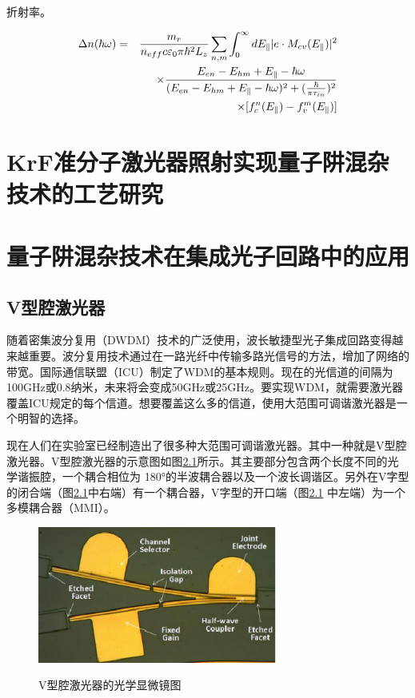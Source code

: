 \documentclass{ZJUthesis}
\begin{document}
折射率。

\begin{eqnarray}
    \Delta n(\hbar\omega) &=& \frac{m_r}{n_{eff} c \varepsilon_0 \pi \hbar^2 L_z}
        \sum_{n,m} \int_0^\infty dE_\parallel |e\cdot M_{cv}(E_\parallel)|^2 \notag\\
    && \times \frac{E_{en}-E_{hm}+E_\parallel-\hbar\omega}
        {(E_{en}-E_{hm}+E_\parallel-\hbar\omega)^2+(\frac{\hbar}{\pi \tau_{in}})^2} \notag\\
    && \times [f_c^n(E_\parallel)-f_v^m(E_\parallel)]
\end{eqnarray}


\chapter{KrF准分子激光器照射实现量子阱混杂技术的工艺研究}




\chapter{量子阱混杂技术在集成光子回路中的应用}

\section{V型腔激光器}

随着密集波分复用（DWDM）技术的广泛使用，波长敏捷型光子集成回路变得越来越重要。波分复用技术通过在一路光纤中传输多路光信号的方法，增加了网络的带宽。国际通信联盟（ICU）制定了WDM的基本规则。现在的光信道的间隔为100GHz或0.8纳米，未来将会变成50GHz或25GHz。要实现WDM，就需要激光器覆盖ICU规定的每个信道。想要覆盖这么多的信道，使用大范围可调谐激光器是一个明智的选择。

现在人们在实验室已经制造出了很多种大范围可调谐激光器。其中一种就是V型腔激光器。V型腔激光器的示意图如图\ref{fig_vccl}所示。其主要部分包含两个长度不同的光学谐振腔，一个耦合相位为 180°的半波耦合器以及一个波长调谐区。另外在V字型的闭合端（图\ref{fig_vccl}中右端）有一个耦合器，V字型的开口端（图\ref{fig_vccl} 中左端）为一个多模耦合器（MMI）。

\begin{figure}[!htb]
  \centering
  \includegraphics[width=0.7\textwidth]{./Pictures/vccl.eps}\\
  \caption{V型腔激光器的光学显微镜图\cite{jin201116-VCCL}}
  \label{fig_vccl}
\end{figure}
\end{document}
